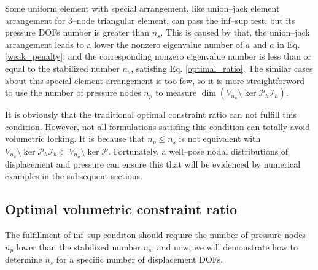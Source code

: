 \begin{rmk}
Some uniform element with special arrangement, like union--jack element arrangement for 3--node triangular element, can pass the inf--sup test\cite{chapelle1993}, but its pressure DOFs number is greater than $n_s$.
This is caused by that,
the union--jack arrangement leads to a lower the nonzero eigenvalue number of $\tilde a$ and $a$ in Eq. \eqref{weak_penalty}, and the corresponding nonzero eigenvalue number is less than or equal to the stabilized number $n_s$, satisfing Eq. \eqref{optimal_ratio}.
The similar cases about this special element arrangement is too few, so it is more straightforword to use the number of pressure nodes $n_p$ to measure $\dim (V_{n_u}\setminus \ker \mathcal P_h \mathcal I_h)$.
\end{rmk}

\begin{rmk}
It is obviously that the traditional optimal constraint ratio can not fulfill this condition.
However, not all formulations satisfing this condition can totally avoid volumetric locking.
It is because that $n_p \le n_s$ is not equivalent with $V_{n_u}\setminus \ker \mathcal P_h \mathcal I_h \subset V_{n_u}\setminus \ker \mathcal P$.
Fortunately, a well--pose nodal distributions of displacement and pressure can ensure this that will be evidenced by numerical examples in the subsequent sections.
\end{rmk}

\subsection{Optimal volumetric constraint ratio}
The fulfillment of inf--sup conditon should require the number of pressure nodes $n_p$ lower than the stabilized number $n_s$, and now, we will demonstrate how to determine $n_s$ for a specific number of displacement DOFs.

